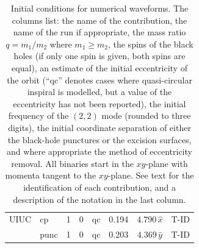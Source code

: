 \begin{table}
\begin{center}
\begin{tabular}{|l|l|l|l|l|l|c|c|}
UIUC \hfill\cite{Etienne:2007hr}          & cp \cite{Etienne:2007hr}     & 1 & $0$       & qc  &
0.194 & $4.790\,\hat x$ & T-ID \cite{Cook:2004kt} \\ 
             & punc \cite{Etienne:2007hr}   & 1 & $0$     & qc  &
              0.203 & $4.369\,\hat y$ & T-ID \cite{Tichy:2003qi} \\ 

 \hline
\end{tabular}
\end{center}
\caption[Initial conditions for numerical waveforms.]{
\label{tab:allwaveforms}
Initial conditions for numerical waveforms.
The columns list: 
the name of the contribution, the name of the run
if appropriate, 
the mass ratio $q=m_1/m_2$ where $m_1\ge m_2$, the
spins of the black holes (if only one spin is given, both spins are equal), an estimate of the initial
eccentricity of the orbit (``qc'' denotes cases where quasi-circular inspiral 
is modelled, but a value of the eccentricity has not been reported), the initial frequency of the $(2,2)$
mode (rounded to three digits), the initial coordinate separation
of either the black-hole punctures or the excision surfaces, and where
appropriate the method of eccentricity removal.  All binaries start
 in the $xy$-plane with momenta tangent to the $xy$-plane.  See text for the
identification of each contribution, and a description of the notation
in the last column.} 
\end{table}



